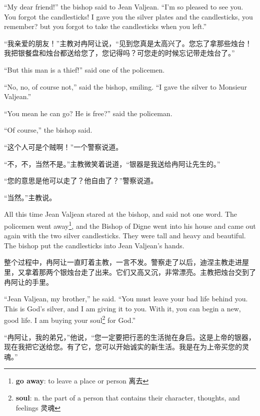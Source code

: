 \documentclass[fontset=ubuntu, zihao=5]{ctexart}
\begin{document}
\begin{paracol}{2}
  \switchcolumn*

  ``My dear friend!'' the bishop said to Jean Valjean. ``I'm so pleased to see you. You forgot the candlesticks! I gave you the silver plates and the candlesticks, you remember? but you forgot to take the candlesticks when you left.''

  \switchcolumn
  “我亲爱的朋友！”主教对冉阿让说，“见到您真是太高兴了。您忘了拿那些烛台！我把银餐盘和烛台都送给您了，您记得吗？可您走的时候忘记带走烛台了。”

  \switchcolumn*

  ``But this man is a thief!'' said one of the policemen.

  ``No, no, of course not,'' said the bishop, smiling. ``I gave the silver to Monsieur Valjean.''

  ``You mean he can go? He is free?'' said the policeman.

  ``Of course,'' the bishop said.

  \switchcolumn

  “这个人可是个贼啊！”一个警察说道。

  “不，不，当然不是。”主教微笑着说道，“银器是我送给冉阿让先生的。”

  “您的意思是他可以走了？他自由了？”警察说道。

  “当然。”主教说。

  \switchcolumn*

  All this time Jean Valjean stared at the bishop, and said not one word. The policemen went away\footnote{\textbf{go away}: to leave a place or person 离去}, and the Bishop of Digne went into his house and came out again with the two silver candlesticks. They were tall and heavy and beautiful. The bishop put the candlesticks into Jean Valjean's hands.

  \switchcolumn
  整个过程中，冉阿让一直盯着主教，一言不发。警察走了以后，迪涅主教走进屋里，又拿着那两个银烛台走了出来。它们又高又沉，非常漂亮。主教把烛台交到了冉阿让的手里。

  \switchcolumn*

  ``Jean Valjean, my brother,'' he said. ``You must leave your bad life behind you. This is God's silver, and I am giving it to you. With it, you can begin a new, good life. I am buying your soul\footnote{\textbf{soul}: n. the part of a person that contains their character, thoughts, and feelings 灵魂} for God.''

  \switchcolumn
  “冉阿让，我的弟兄，”他说，“您一定要把行恶的生活抛在身后。这是上帝的银器，现在我把它送给您。有了它，您可以开始诚实的新生活。我是在为上帝买您的灵魂。”


\end{paracol}
\end{document}

